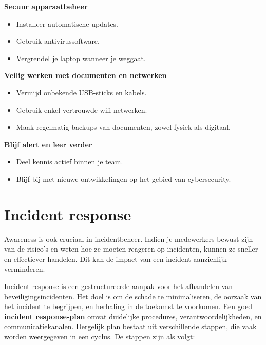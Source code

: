 \documentclass[
  10pt,
  dutch,
  paper=a4,
  ,captions=tableheading
]{scrbook}
\providecommand{\tightlist}{%
  \setlength{\itemsep}{0pt}\setlength{\parskip}{0pt}}
\begin{document}
\textbf{Secuur apparaatbeheer}

\begin{itemize}
\tightlist
\item
  Installeer automatische updates.
\item
  Gebruik antivirussoftware.
\item
  Vergrendel je laptop wanneer je weggaat.
\end{itemize}

\textbf{Veilig werken met documenten en netwerken}

\begin{itemize}
\tightlist
\item
  Vermijd onbekende USB-sticks en kabels.
\item
  Gebruik enkel vertrouwde wifi-netwerken.
\item
  Maak regelmatig backups van documenten, zowel fysiek als digitaal.
\end{itemize}

\textbf{Blijf alert en leer verder}

\begin{itemize}
\tightlist
\item
  Deel kennis actief binnen je team.
\item
  Blijf bij met nieuwe ontwikkelingen op het gebied van cybersecurity.
\end{itemize}

\section{Incident response}\label{incident-response}

Awareness is ook cruciaal in incidentbeheer. Indien je medewerkers
bewust zijn van de risico's en weten hoe ze moeten reageren op
incidenten, kunnen ze sneller en effectiever handelen. Dit kan de impact
van een incident aanzienlijk verminderen.

Incident response is een gestructureerde aanpak voor het afhandelen van
beveiligingsincidenten. Het doel is om de schade te minimaliseren, de
oorzaak van het incident te begrijpen, en herhaling in de toekomst te
voorkomen. Een goed \textbf{incident response-plan} omvat duidelijke
procedures, verantwoordelijkheden, en communicatiekanalen. Dergelijk
plan bestaat uit verschillende stappen, die vaak worden weergegeven in
een cyclus. De stappen zijn als volgt:
\end{document}
